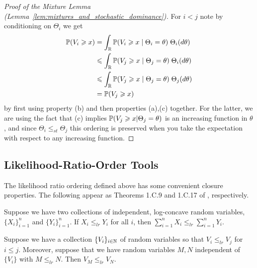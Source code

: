 \begin{subappendices}
\begin{proof}[Proof of the Mixture Lemma (Lemma~\ref{lem:mixtures_and_stochastic_dominance})]
    For $i < j$ note by conditioning on $\Theta_i$ we get
    \begin{align*}
        \P(V_i \geq x) & = \int_\R \P(V_i \geq x \; | \; \Theta_i = \theta) \; \Theta_i(d\theta) \\
        & \leq \int_\R \P(V_j \geq x \; | \; \Theta_j = \theta) \; \Theta_i(d\theta)\\
        & \leq \int_\R \P(V_j \geq x \; | \; \Theta_j = \theta) \; \Theta_j(d\theta) \\
        & = \P(V_j \geq x)
    \end{align*}
    \noindent by first using property (b) and then properties (a),(c) together. For the latter, we are using the fact that (c) implies $\P(V_j \geq x | \Theta_j = \theta)$ is an increasing function in $\theta$, and since $\Theta_i \leq_{st} \Theta_j$ this ordering is preserved when you take the expectation with respect to any increasing function.
    \end{proof}

    \subsection{Likelihood-Ratio-Order Tools}
    \label{app:likelihood-ratio-ordering}
    The likelihood ratio ordering defined above has some convenient closure
    properties. The following appear as Theorems 1.C.9 and 1.C.17 of
    \cite{shaked2007_stochastic_orders}, respectively.

    \begin{theorem}
\label{thm:convolutions_and_likelihood_ratio_order}
        Suppose we have two collections of independent, log-concave random variables,
        $\{X_i\}_{i=1}^n$ and $\{Y_i\}_{i=1}^n$. If $X_i \leq_{lr} Y_i$ for all
        $i$, then $\sum_{i=1}^n X_i \leq_{lr} \sum_{i=1}^n Y_i$.
    \end{theorem}

\begin{theorem}
\label{thm:mixtures_and_likelihood_ratio_order}
Suppose we have a collection $\{V_i\}_{i\in \N}$ of random variables so that $V_i \leq_{lr} V_j$ for $i \leq j$. Moreover, suppose that we have random variables $M,N$ independent of $\{V_i\}$ with $M \leq_{lr} N$. Then $V_M \leq_{lr} V_N$.
\end{theorem}


\end{subappendices}
